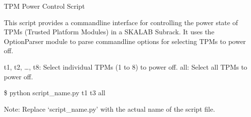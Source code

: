 \documentclass[letterpaper,10pt,english]{sphinxmanual}
\begin{document}
\begin{fulllineitems}
\label{\detokenize{toolsdocs:power_off_tpm.usage_hexample}}
\pysigstartsignatures
{}
\pysigstopsignatures
\sphinxAtStartPar
TPM Power Control Script

\sphinxAtStartPar
This script provides a command\sphinxhyphen{}line interface for controlling the power state of TPMs (Trusted Platform Modules) in a SKALAB Subrack. It uses the OptionParser module to parse command\sphinxhyphen{}line options for selecting TPMs to power off.
\begin{description}
\sphinxAtStartPar
\textendash{}t1, \textendash{}t2, …, \textendash{}t8: Select individual TPMs (1 to 8) to power off.
\textendash{}all: Select all TPMs to power off.

\sphinxAtStartPar
\$ python script\_name.py \textendash{}t1 \textendash{}t3 \textendash{}all

\end{description}

\sphinxAtStartPar
Note: Replace ‘script\_name.py’ with the actual name of the script file.

\end{fulllineitems}

\label{\detokenize{toolsdocs:module-fpga_reg}}\label{\detokenize{toolsdocs:module-fpga_i2c_reg}}\label{\detokenize{toolsdocs:module-i2c_reg}}
\end{document}
